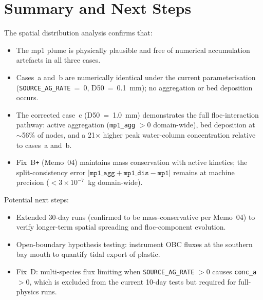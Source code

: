 \documentclass[11pt]{article}
\begin{document}
\section*{Summary and Next Steps}

The spatial distribution analysis confirms that:
\begin{itemize}
  \item The mp1 plume is physically plausible and free of numerical
        accumulation artefacts in all three cases.
  \item Cases~a and~b are numerically identical under the current
        parameterisation (\texttt{SOURCE\_AG\_RATE}~=~0, D50~=~0.1~mm);
        no aggregation or bed deposition occurs.
  \item The corrected case~c (D50~=~1.0~mm) demonstrates the full
        floc-interaction pathway: active aggregation
        (\texttt{mp1\_agg} $> 0$ domain-wide), bed deposition at
        $\sim$56\% of nodes, and a 21$\times$ higher peak water-column
        concentration relative to cases~a and~b.
  \item Fix~B\texttt{+} (Memo~04) maintains mass conservation with
        active kinetics; the split-consistency error
        $|\texttt{mp1\_agg}+\texttt{mp1\_dis}-\texttt{mp1}|$ remains
        at machine precision ($< 3\times10^{-7}$~kg domain-wide).
\end{itemize}

Potential next steps:
\begin{itemize}
  \item Extended 30-day runs (confirmed to be mass-conservative per Memo~04)
        to verify longer-term spatial spreading and floc-component evolution.
  \item Open-boundary hypothesis testing: instrument OBC fluxes at the
        southern bay mouth to quantify tidal export of plastic.
  \item Fix~D: multi-species flux limiting when \texttt{SOURCE\_AG\_RATE} $> 0$
        causes \texttt{conc\_a} $> 0$, which is excluded from the current
        10-day tests but required for full-physics runs.
\end{itemize}
\end{document}

